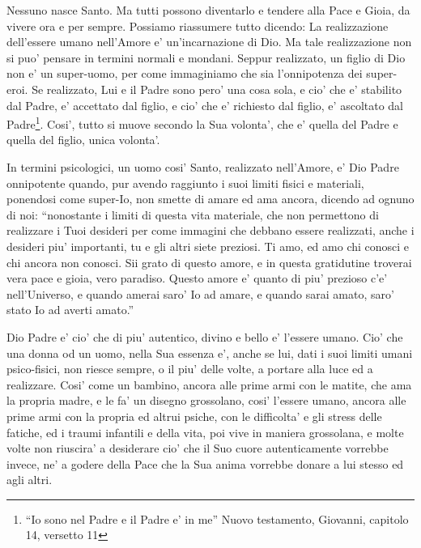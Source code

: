 Nessuno nasce Santo. Ma tutti possono diventarlo e tendere alla Pace e Gioia, da vivere ora e per sempre.
Possiamo riassumere tutto dicendo:
La realizzazione dell'essere umano nell'Amore e' un'incarnazione di Dio. Ma tale realizzazione non si puo' pensare in termini normali e mondani. Seppur realizzato, un figlio di Dio non e' un super-uomo, per come immaginiamo che sia l'onnipotenza dei super-eroi. Se realizzato, Lui e il Padre sono pero' una cosa sola, e cio' che e' stabilito dal Padre, e' accettato dal figlio, e cio' che e' richiesto dal figlio, e' ascoltato dal Padre\footnote{``Io sono nel Padre e il Padre e' in me'' Nuovo testamento, Giovanni, capitolo 14, versetto 11}. Cosi', tutto si muove secondo la Sua volonta', che e' quella del Padre e quella del figlio, unica volonta'.

In termini psicologici, un uomo cosi' Santo, realizzato nell'Amore, e' Dio Padre onnipotente quando, pur avendo raggiunto i suoi limiti fisici e materiali, ponendosi come super-Io, non smette di amare ed ama ancora, dicendo ad ognuno di noi: 
``nonostante i limiti di questa vita materiale, che non permettono di realizzare i Tuoi desideri per come immagini che debbano essere realizzati, anche i desideri piu' importanti, tu e gli altri siete preziosi. Ti amo, ed amo chi conosci e chi ancora non conosci.
Sii grato di questo amore, e in questa gratidutine troverai vera pace e gioia, vero paradiso. Questo amore e' quanto di piu' prezioso c'e' nell'Universo, e quando amerai saro' Io ad amare, e quando sarai amato, saro' stato Io ad averti amato.''

Dio Padre e' cio' che di piu' autentico, divino e bello e' l'essere umano. Cio' che una donna od un uomo, nella Sua essenza e', anche se lui, dati i suoi limiti umani psico-fisici, non riesce sempre, o il piu' delle volte, a portare alla luce ed a realizzare. Cosi' come un bambino, ancora alle prime armi con le matite, che ama la propria madre, e le fa' un disegno grossolano, cosi' l'essere umano, ancora alle prime armi con la propria ed altrui psiche, con le difficolta' e gli stress delle fatiche, ed i traumi infantili e della vita, poi vive in maniera grossolana, e molte volte non riuscira' a desiderare cio' che il Suo cuore autenticamente vorrebbe invece, ne' a godere della Pace che la Sua anima vorrebbe donare a lui stesso ed agli altri.

